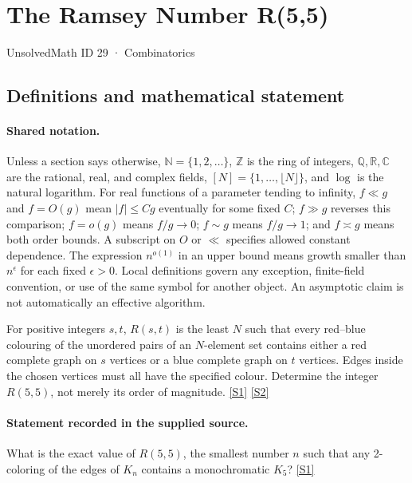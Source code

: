 \documentclass[11pt,a4paper]{article}
\newcommand{\N}{\mathbb{N}}
\newcommand{\Z}{\mathbb{Z}}
\newcommand{\Q}{\mathbb{Q}}
\newcommand{\R}{\mathbb{R}}
\newcommand{\C}{\mathbb{C}}
\newcommand{\sref}[2]{\hyperlink{source:#1:#2}{[S#2]}}
\begin{document}

\setcounter{section}{28}

\section{The Ramsey Number R(5,5)}\label{29}

{\small\sffamily UnsolvedMath ID 29 · Combinatorics}

\subsection{Definitions and mathematical statement}

\paragraph{Shared notation.}Unless a section says otherwise, $\N=\{1,2,\ldots\}$,
$\Z$ is the ring of integers, $\Q,\R,\C$ are the rational, real, and complex
fields, $[N]=\{1,\ldots,\lfloor N\rfloor\}$, and $\log$ is the natural
logarithm. For real functions of a parameter tending to infinity,
$f\ll g$ and $f=O(g)$ mean $|f|\leq Cg$ eventually for some fixed $C$;
$f\gg g$ reverses this comparison; $f=o(g)$ means $f/g\to0$;
$f\sim g$ means $f/g\to1$; and $f\asymp g$ means both order bounds.
A subscript on $O$ or $\ll$ specifies allowed constant dependence.
The expression $n^{o(1)}$ in an upper bound means growth smaller than
$n^\epsilon$ for each fixed $\epsilon>0$. Local definitions govern any
exception, finite-field convention, or use of the same symbol for another
object. An asymptotic claim is not automatically an effective algorithm.



For positive integers $s,t$, $R(s,t)$ is the least $N$ such that every red--blue colouring of the unordered pairs of an $N$-element set contains either a red complete graph on $s$ vertices or a blue complete graph on $t$ vertices. Edges inside the chosen vertices must all have the specified colour. Determine the integer $R(5,5)$, not merely its order of magnitude. \sref{29}{1} \sref{29}{2}

\paragraph{Statement recorded in the supplied source.}
What is the exact value of $R(5,5)$, the smallest number $n$ such that any 2-coloring of the edges of $K_n$ contains a monochromatic $K_5$? \sref{29}{1}
\end{document}
